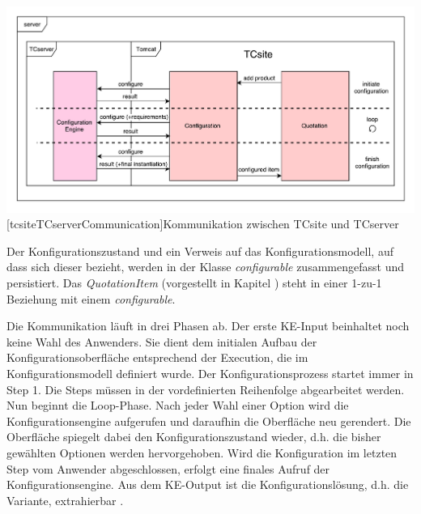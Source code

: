 \documentclass[12pt,a4paper,bibliography=totocnumbered,listof=totoc]{scrartcl}
\begin{document}
\vspace{1em}
\begin{minipage}{\linewidth}
	\centering
	\includegraphics[width=1\linewidth]{Abbildungen/tcsiteTCserverCommunication.pdf}
	[tcsiteTCserverCommunication]{Kommunikation zwischen TCsite und TCserver}
	\label{fig:tcsiteTCserverCommunication}
\end{minipage}
\vspace{1em}

Der Konfigurationszustand und ein Verweis auf das Konfigurationsmodell, auf dass  sich dieser bezieht, werden in der Klasse \emph{configurable} zusammengefasst und persistiert. Das \emph{QuotationItem} (vorgestellt in Kapitel  \label{subsubsection:tcsiteArchitektur}) steht in einer 1-zu-1 Beziehung mit einem \emph{configurable}.

Die Kommunikation läuft in drei Phasen ab. Der erste KE-Input beinhaltet noch keine Wahl des Anwenders. Sie dient dem initialen Aufbau der Konfigurationsoberfläche entsprechend der Execution, die im Konfigurationsmodell definiert wurde. Der Konfigurationsprozess startet immer in Step 1. Die Steps müssen in der vordefinierten Reihenfolge abgearbeitet werden. Nun beginnt die Loop-Phase. Nach jeder Wahl einer Option wird die Konfigurationsengine aufgerufen und daraufhin die Oberfläche neu gerendert. Die Oberfläche spiegelt dabei den Konfigurationszustand wieder, d.h. die bisher gewählten Optionen werden hervorgehoben. Wird die Konfiguration im letzten Step vom Anwender abgeschlossen, erfolgt eine finales Aufruf der Konfigurationsengine. Aus dem KE-Output ist die Konfigurationslösung, d.h. die Variante, extrahierbar \citep{tactonTCsiteDevelopmentManual}.
\end{document}
